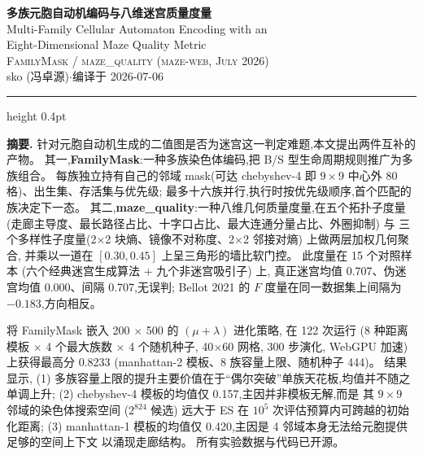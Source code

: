 \documentclass[11pt,a4paper]{article}
\newcommand{\cin}{Vermilion}
\newcommand{\ink}{InkWarm}
\begin{document}
\begin{center}
{\Large\bfseries\color{\ink} 多族元胞自动机编码与八维迷宫质量度量}\\[0.3em]
{\large\color{GrayMid} Multi-Family Cellular Automaton Encoding with an\\ Eight-Dimensional Maze Quality Metric}\\[0.6em]
{\small\scshape FamilyMask / maze\_quality (maze-web, July 2026)}\\[0.3em]
{\color{GrayMid}\small sko (冯卓源)\quad$\cdot$\quad 编译于 2026-07-06}
\end{center}

\vspace{0.4em}
\hrule height 0.4pt
\vspace{1.0em}

\begin{tcolorbox}[colback=PaperWarm,colframe=SepiaLine,arc=2pt,boxrule=0.5pt,
                  left=10pt,right=10pt,top=8pt,bottom=8pt]
\noindent\textbf{\color{\cin}摘要.}\quad
针对元胞自动机生成的二值图是否为迷宫这一判定难题,本文提出两件互补的产物。
其一,\textbf{FamilyMask}:一种多族染色体编码,把 B/S 型生命周期规则推广为多族组合。
每族独立持有自己的邻域 mask(可达 chebyshev-4 即 $9\times 9$ 中心外 80 格)、出生集、存活集与优先级;
最多十六族并行,执行时按优先级顺序,首个匹配的族决定下一态。
其二,\textbf{maze\_quality}:一种八维几何质量度量,在五个拓扑子度量
(走廊主导度、最长路径占比、十字口占比、最大连通分量占比、外圈抑制) 与
三个多样性子度量(2$\times$2 块熵、镜像不对称度、2$\times$2 邻接对熵) 上做两层加权几何聚合,
并乘以一道在 $[0.30, 0.45]$ 上呈三角形的墙比软门控。
此度量在 15 个对照样本 (六个经典迷宫生成算法 + 九个非迷宫吸引子) 上,
真正迷宫均值 0.707、伪迷宫均值 0.000、间隔 0.707,无误判;
Bellot 2021 的 $F$ 度量在同一数据集上间隔为 $-0.183$,方向相反。

将 FamilyMask 嵌入 200 $\times$ 500 的 $(\mu+\lambda)$ 进化策略,
在 122 次运行 (8 种距离模板 $\times$ 4 个最大族数 $\times$ 4 个随机种子,
40$\times$60 网格, 300 步演化, WebGPU 加速) 上获得最高分 0.8233
(manhattan-2 模板、8 族容量上限、随机种子 444)。
结果显示,
(1) 多族容量上限的提升主要价值在于``偶尔突破''单族天花板,均值并不随之单调上升;
(2) chebyshev-4 模板的均值仅 0.157,主因并非模板无解,而是
其 $9\times 9$ 邻域的染色体搜索空间 ($2^{824}$ 候选)
远大于 ES 在 $10^5$ 次评估预算内可跨越的初始化距离;
(3) manhattan-1 模板的均值仅 0.420,主因是 4 邻域本身无法给元胞提供足够的空间上下文
以涌现走廊结构。
所有实验数据与代码已开源。
\end{tcolorbox}
\end{document}
